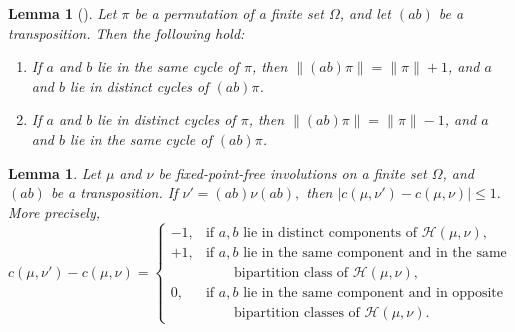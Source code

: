 \documentclass[10pt,a4paper]{amsart}
\newtheorem{lemma}[theorem]{Lemma}
\begin{document}
\begin{lemma}[\cite{Stahl1987}] \label{lem2:10}
Let $\pi$ be a permutation of a finite set $\Omega$, and let $(ab)$ be a transposition. Then the following hold:
\begin{enumerate}
    \item If $a$ and $b$ lie in the same cycle of $\pi$, then $\lVert (ab)\pi\rVert=\lVert \pi\rVert+1$, and $a$ and $b$ lie in distinct cycles of $(ab)\pi$.
    \item If $a$ and $b$ lie in distinct cycles of $\pi$, then $\lVert (ab)\pi\rVert=\lVert \pi\rVert-1$, and $a$ and $b$ lie in the same cycle of $(ab)\pi$.
\end{enumerate}
\end{lemma}


\begin{lemma}
\label{lem2:11}
Let $\mu$ and $\nu$ be fixed-point-free involutions on a finite set
$\Omega$, and $(ab)$ be a transposition. If $\nu'=(ab)\nu (ab),$ then $|c(\mu,\nu')-c(\mu,\nu)|\le 1.$
More precisely,
\[
c(\mu,\nu')-c(\mu,\nu)=
\begin{cases}
-1, & \text{if $a,b$ lie in distinct components of }
       \mathcal H(\mu,\nu),\\
+1, & \text{if $a,b$ lie in the same component and in the same}\\
    & \qquad \text{bipartition class of }\mathcal H(\mu,\nu),\\
0,  & \text{if $a,b$ lie in the same component and in opposite}\\
    & \qquad \text{bipartition classes of }\mathcal H(\mu,\nu).
\end{cases}\]
\end{lemma}
\end{document}
